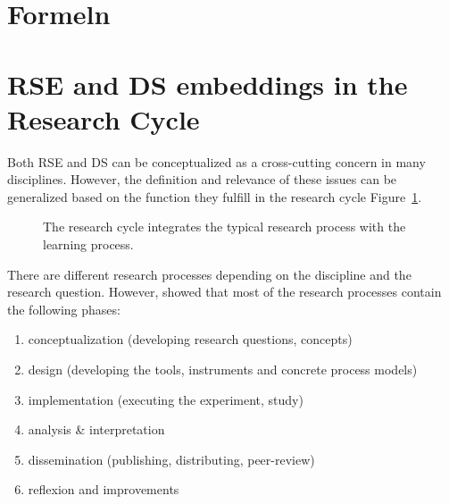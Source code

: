 \documentclass[
        english,biblatex
    ]{lni}
\providecommand{\tightlist}{%
    \setlength{\itemsep}{0pt}\setlength{\parskip}{0pt}}
\begin{document}
    \section{Formeln}\label{formeln}

    \section{RSE and DS embeddings in the Research
    Cycle}\label{rse-and-ds-embeddings-in-the-research-cycle}

    Both RSE and DS can be conceptualized as a cross-cutting concern in
    many disciplines. However, the definition and relevance of these
    issues can be generalized based on the function they fulfill in the
    research cycle Figure~\ref{fig-research_cycle}.

    \newpage

    \begin{figure}


    \caption{\label{fig-research_cycle}The research cycle
    \autocite{wildt2009forschendes} integrates the typical research
    process with the learning process.}

    \end{figure}%

    There are different research processes depending on the discipline
    and the research question. However, \autocite{Dehne2021} showed that
    most of the research processes contain the following phases:

    \begin{enumerate}
    \def\labelenumi{\arabic{enumi}.}
    \tightlist
    \item
      conceptualization (developing research questions, concepts)
    \item
      design (developing the tools, instruments and concrete process
      models)
    \item
      implementation (executing the experiment, study)
    \item
      analysis \& interpretation
    \item
      dissemination (publishing, distributing, peer-review)
    \item
      reflexion and improvements
    \end{enumerate}
\end{document}
